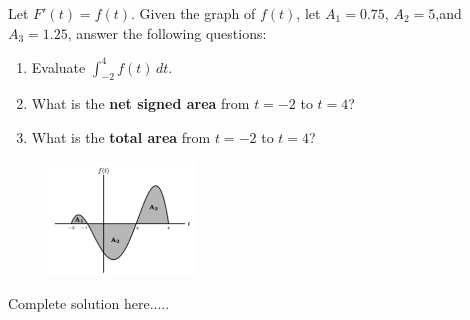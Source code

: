 \begin{example}
Let $F'(t)=f(t)$. Given the graph of $f(t)$, let $A_1=0.75$, $A_2=5$,and $A_3=1.25$, answer the following questions:
\renewcommand{\labelenumi}{\textbf{(\alph{enumi})}}
\begin{enumerate}[leftmargin=*]
\item Evaluate $\displaystyle \int_{-2}^4 f(t) \,dt$.
\item What is the \textbf{net signed area} from $t=-2$ to $t=4$?
\item What is the \textbf{total area} from $t=-2$ to $t=4$?
\end{enumerate}
\begin{figure}[h!]
        \includegraphics[width=0.35\textwidth,inner]{images/defIntgArea/areaConcept1.png}
        \captionsetup{justification=justified, singlelinecheck=false}
        \label{fig:areaEx1}
\end{figure}
    \begin{sol}
    
    \end{sol}
    \begin{solL}
    Complete solution here.....
    
    \end{solL}
\end{example}
\newpage

